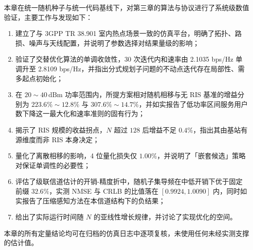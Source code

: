 本章在统一随机种子与统一代码基线下，对第三章的算法与协议进行了系统级数值验证，主要工作与发现如下：

\begin{enumerate}
  \item 建立了与 3GPP TR 38.901 室内热点场景一致的仿真平台，明确了拓扑、路损、噪声与天线配置，并说明了参数选择对结果量级的影响；
  \item 验证了交替优化算法的单调收敛性，30 次迭代内和速率由 2.1035 bps/Hz 单调升至 2.8109 bps/Hz，并指出分式规划子问题的不动点迭代存在局部性、需多起点初始化；
  \item 在 $20\sim40\,\mathrm{dBm}$ 功率范围内，所提方案相对随机相移与无 RIS 基准的增益分别为 $223.6\%\sim12.8\%$ 与 $307.6\%\sim14.7\%$，并如实报告了低功率区间服务用户数下降这一最大化和速率准则的固有行为；
  \item 揭示了 RIS 规模的收益拐点，$N$ 超过 $128$ 后增益不足 $0.4\%$，指出其由基站有源维度而非 RIS 本身决定；
  \item 量化了离散相移的影响，4 位量化损失仅 $1.00\%$，并说明了「嵌套候选」策略对保证单调性的必要性；
  \item 评估了级联信道估计的开销-精度折中，随机子集导频在中低开销下优于固定前缀 $32.6\%$，实测 NMSE 与 CRLB 的比值落在 $[0.9924,1.0090]$ 内，同时如实报告了压缩感知方法在本信道结构下的负结果；
  \item 给出了实际运行时间随 $N$ 的亚线性增长规律，并讨论了实现优化的空间。
\end{enumerate}

本章的所有定量结论均可在归档的仿真日志中逐项复核，未使用任何未经实测支撑的估计值。
